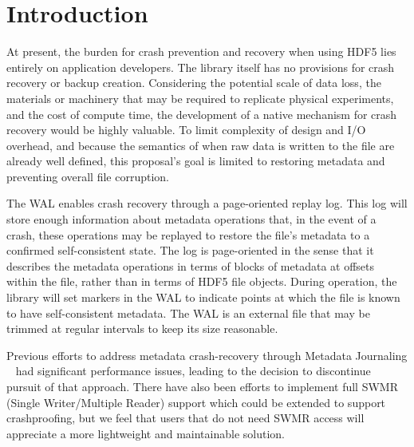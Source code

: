 \documentclass[../HDF5_RFC.tex]{subfiles}
\begin{document}
\section*{Introduction}
\label{sec:intro}

At present, the burden for crash prevention and recovery when using HDF5 lies entirely on application developers. The library itself has no provisions for crash recovery or backup creation. Considering the potential scale of data loss, the materials or machinery that may be required to replicate physical experiments, and the cost of compute time, the development of a native mechanism for crash recovery would be highly valuable. To limit complexity of design and I/O overhead, and because the semantics of when raw data is written to the file are already well defined, this proposal's goal is limited to restoring metadata and preventing overall file corruption. 

The WAL enables crash recovery through a page-oriented replay log. This log will store enough information about metadata operations that, in the event of a crash, these operations may be replayed to restore the file's metadata to a confirmed self-consistent state. The log is page-oriented in the sense that it describes the metadata operations in terms of blocks of metadata at offsets within the file, rather than in terms of HDF5 file objects. During operation, the library will set markers in the WAL to indicate points at which the file is known to have self-consistent metadata. The WAL is an external file that may be trimmed at regular intervals to keep its size reasonable.

Previous efforts to address metadata crash-recovery through Metadata Journaling ~\cite{rfc20070801} had significant performance issues, leading to the decision to discontinue pursuit of that approach. There have also been efforts to implement full SWMR (Single Writer/Multiple Reader) support which could be extended to support crashproofing, but we feel that users that do not need SWMR access will appreciate a more lightweight and maintainable solution.

\vspace{-10pt}
\end{document}
